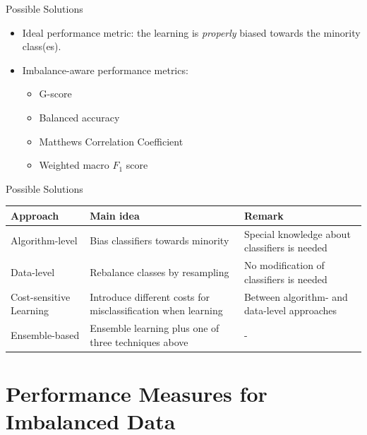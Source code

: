 \documentclass[11pt,compress,t,notes=noshow, xcolor=table]{beamer}
\begin{document}
\begin{frame}{Possible Solutions}
	\begin{itemize}
        
		\item Ideal performance metric: the learning is \emph{properly} biased towards the minority class(es).	

        \item Imbalance-aware performance metrics:
        \begin{itemize}
            \item G-score
            \item Balanced accuracy
            \item Matthews Correlation Coefficient
            \item Weighted macro $F_1$ score
        \end{itemize}
	\end{itemize}
\end{frame} 


\begin{frame}{Possible Solutions}
\begin{table}[h]
\footnotesize
    \centering
    \begin{tabular}{p{} p{} p{}}
        \toprule
        \textbf{Approach} & \textbf{Main idea} & \textbf{Remark} \\ [5pt]
        \hline
        Algorithm-level & Bias classifiers towards minority & Special knowledge about classifiers is needed \\ [5pt]
        \hline
        Data-level & Rebalance classes by resampling & No modification of classifiers is needed \\ [5pt]
        \hline
        Cost-sensitive Learning & Introduce different costs for misclassification when learning & Between algorithm- and data-level approaches \\ [15pt]
        \hline
        Ensemble-based & Ensemble learning plus one of three techniques above & - \\ [5pt]
        \bottomrule
    \end{tabular}
\end{table}

\end{frame}


\section{Performance Measures for Imbalanced Data}
\end{document}

